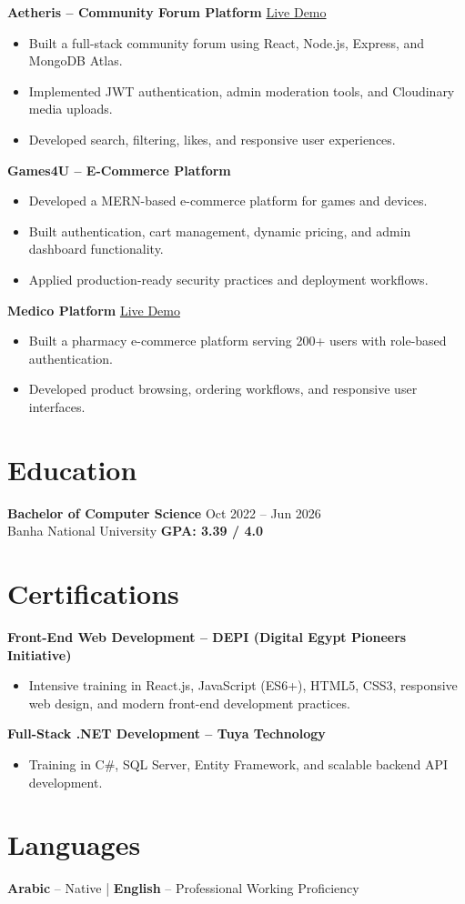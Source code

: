 \documentclass[10pt, letterpaper]{article}
\newenvironment{highlights}{
    \begin{itemize}[
        topsep=0.10 cm,
        parsep=0.04 cm,
        itemsep=0.04 cm,
        leftmargin=0.5 cm
    ]
}{\end{itemize}}
\begin{document}
\textbf{Aetheris -- Community Forum Platform} \hfill \href{https://la2aetheris.com/}{Live Demo}
\begin{highlights}
    \item Built a full-stack community forum using React, Node.js, Express, and MongoDB Atlas.
    \item Implemented JWT authentication, admin moderation tools, and Cloudinary media uploads.
    \item Developed search, filtering, likes, and responsive user experiences.
\end{highlights}

\textbf{Games4U -- E-Commerce Platform}
\begin{highlights}
    \item Developed a MERN-based e-commerce platform for games and devices.
    \item Built authentication, cart management, dynamic pricing, and admin dashboard functionality.
    \item Applied production-ready security practices and deployment workflows.
\end{highlights}

\textbf{Medico Platform} \hfill \href{https://medico-brown-six.vercel.app/}{Live Demo}
\begin{highlights}
    \item Built a pharmacy e-commerce platform serving 200+ users with role-based authentication.
    \item Developed product browsing, ordering workflows, and responsive user interfaces.
\end{highlights}

\section{Education}
\textbf{Bachelor of Computer Science} \hfill {Oct 2022 -- Jun 2026} \\
Banha National University \hfill \textbf{GPA: 3.39 / 4.0}
\section{Certifications}
\textbf{Front-End Web Development -- DEPI (Digital Egypt Pioneers Initiative)}
\begin{highlights}
    \item Intensive training in React.js, JavaScript (ES6+), HTML5, CSS3, responsive web design, and modern front-end development practices.
\end{highlights}
\textbf{Full-Stack .NET Development -- Tuya Technology}
\begin{highlights}
    \item Training in C\#, SQL Server, Entity Framework, and scalable backend API development.
\end{highlights}
\section{Languages}
\textbf{Arabic} -- Native \quad | \quad \textbf{English} -- Professional Working Proficiency
\end{document}
